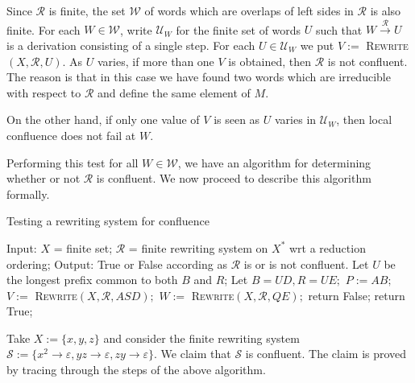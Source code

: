 \begin{ap} Since $\mathcal{R}$ is finite, the set $\mathcal{W}$ of words which
    are overlaps of left sides in $\mathcal{R}$ is also finite. For each $W\in
    \mathcal{W}$, write $\mathcal{U}_W$ for the finite set of words $U$ such
    that $W \xrightarrow{\mathcal{R}} U$ is a derivation consisting of a single
    step. For each $U\in \mathcal{U}_W$ we put $V :=$
    \textsc{Rewrite}$(X,\mathcal{R},U)$. As $U$ varies, if more than one $V$ is
    obtained, then $\mathcal{R}$ is not confluent. The reason is that in this
    case we have found two words which are irreducible with respect to
    $\mathcal{R}$ and define the same element of $M$.

    On the other hand, if only one value of $V$ is seen as $U$ varies in $\mathcal{U}_W$, then local confluence does not fail at $W$.

    Performing this test for all $W\in \mathcal{W}$, we have an algorithm for
    determining whether or not $\mathcal{R}$ is confluent. We now proceed to
    describe this algorithm formally.

\begin{algorithm}
\caption{Testing a rewriting system for confluence}
\begin{algorithmic}[1]
    \State Input:
    \State $X$ = finite set;
    \State $\mathcal{R}$ = finite rewriting system on $X^*$ wrt a reduction ordering;
    \State Output:
    \State True or False according as $\mathcal{R}$ is or is not confluent.
    \State
    \State Let $U$ be the longest prefix common to both $B$ and $R$;
    \State Let $B = UD, R = UE;$
    \State $P := AB;$
    \State $V :=$ \textsc{Rewrite}$(X,\mathcal{R},ASD);$
    \State $W :=$ \textsc{Rewrite}$(X,\mathcal{R},QE);$
    \State return False;
    \EndIf
    \EndIf
    \EndFor
    \EndFor
    \EndFor
    \State return True;
    \EndProcedure
\end{algorithmic}
\end{algorithm}
\end{ap}
\newpage{}

\begin{eg} Take $X := \{x,y,z\}$ and consider the finite rewriting system
    $\mathcal{S} := \{x^2 \rightarrow \varepsilon, yz\rightarrow \varepsilon,
    zy \rightarrow\varepsilon \}.$ We claim that $\mathcal{S}$ is confluent.
    The claim is proved by tracing through the steps of the above algorithm.
\end{eg}

